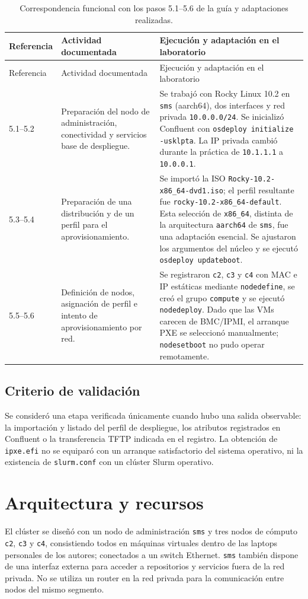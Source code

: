 \documentclass[12pt,a4paper]{article}
\begin{document}
\begin{longtable}{p{2.0cm}p{4.0cm}p{6.3cm}}
\caption{Correspondencia funcional con los pasos 5.1--5.6 de la guía y adaptaciones realizadas.}\label{tab:metodologia}\\
\toprule
Referencia & Actividad documentada & Ejecución y adaptación en el laboratorio \\
\midrule\endfirsthead
\toprule
Referencia & Actividad documentada & Ejecución y adaptación en el laboratorio \\
\midrule\endhead
5.1--5.2 & Preparación del nodo de administración, conectividad y servicios base de despliegue. & Se trabajó con Rocky Linux 10.2 en \texttt{sms} (aarch64), dos interfaces y red privada \texttt{10.0.0.0/24}. Se inicializó Confluent con \texttt{osdeploy initialize -usklpta}. La IP privada cambió durante la práctica de \texttt{10.1.1.1} a \texttt{10.0.0.1}. \\
5.3--5.4 & Preparación de una distribución y de un perfil para el aprovisionamiento. & Se importó la ISO \texttt{Rocky-10.2-x86\_64-dvd1.iso}; el perfil resultante fue \texttt{rocky-10.2-x86\_64-default}. Esta selección de \texttt{x86\_64}, distinta de la arquitectura \texttt{aarch64} de \texttt{sms}, fue una adaptación esencial. Se ajustaron los argumentos del núcleo y se ejecutó \texttt{osdeploy updateboot}. \\
5.5--5.6 & Definición de nodos, asignación de perfil e intento de aprovisionamiento por red. & Se registraron \texttt{c2}, \texttt{c3} y \texttt{c4} con MAC e IP estáticas mediante \texttt{nodedefine}, se creó el grupo \texttt{compute} y se ejecutó \texttt{nodedeploy}. Dado que las VMs carecen de BMC/IPMI, el arranque PXE se seleccionó manualmente; \texttt{nodesetboot} no pudo operar remotamente. \\
\bottomrule
\end{longtable}

\subsection{Criterio de validación}
Se consideró una etapa verificada únicamente cuando hubo una salida observable: la importación y listado del perfil de despliegue, los atributos registrados en Confluent o la transferencia TFTP indicada en el registro. La obtención de \texttt{ipxe.efi} no se equiparó con un arranque satisfactorio del sistema operativo, ni la existencia de \texttt{slurm.conf} con un clúster Slurm operativo.

\section{Arquitectura y recursos}
El clúster se diseñó con un nodo de administración \texttt{sms} y tres nodos de cómputo \texttt{c2}, \texttt{c3} y \texttt{c4}, consistiendo todos en máquinas virtuales dentro de las laptops personales de los autores; conectados a un switch Ethernet. \texttt{sms} también dispone de una interfaz externa para acceder a repositorios y servicios fuera de la red privada. No se utiliza un router en la red privada para la comunicación entre nodos del mismo segmento.
\end{document}
